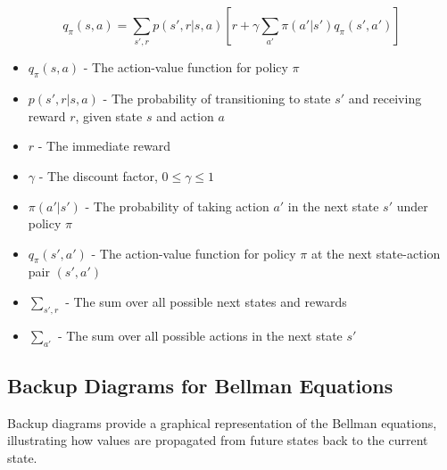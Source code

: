 \documentclass[12pt,a4paper]{article}
\begin{document}
\begin{equation}
q_\pi(s,a) = \sum_{s',r} p(s',r|s,a) \left[r + \gamma \sum_{a'} \pi(a'|s') q_\pi(s',a') \right]
\end{equation}

\begin{tcolorbox}[title=Notation Overview]
\begin{itemize}
    \item $q_\pi(s,a)$ - The action-value function for policy $\pi$
    \item $p(s',r|s,a)$ - The probability of transitioning to state $s'$ and receiving reward $r$, given state $s$ and action $a$
    \item $r$ - The immediate reward
    \item $\gamma$ - The discount factor, $0 \leq \gamma \leq 1$
    \item $\pi(a'|s')$ - The probability of taking action $a'$ in the next state $s'$ under policy $\pi$
    \item $q_\pi(s',a')$ - The action-value function for policy $\pi$ at the next state-action pair $(s', a')$
    \item $\sum_{s',r}$ - The sum over all possible next states and rewards
    \item $\sum_{a'}$ - The sum over all possible actions in the next state $s'$
\end{itemize}
\end{tcolorbox}

\subsection{Backup Diagrams for Bellman Equations}

Backup diagrams provide a graphical representation of the Bellman equations, illustrating how values are propagated from future states back to the current state.
\end{document}
